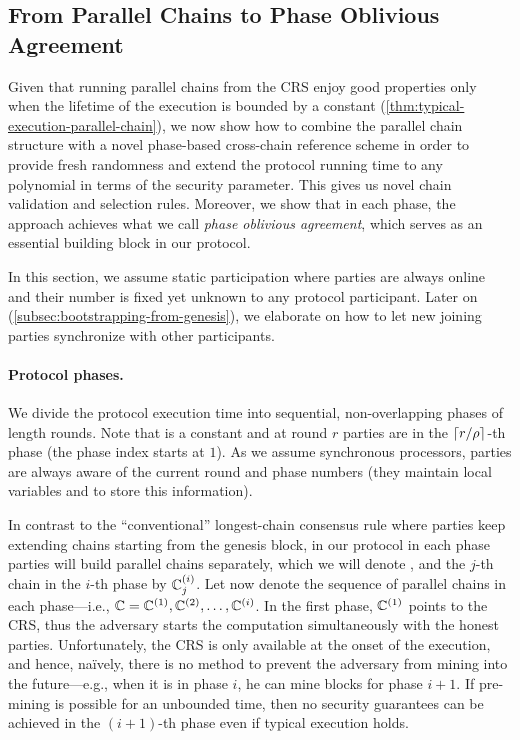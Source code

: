 \subsection{From Parallel Chains to Phase Oblivious Agreement}
\label{subsec:phase-oblivious-agreement}

Given that running parallel chains from the CRS enjoy good properties only when the lifetime of the execution is bounded by a constant (\cref{thm:typical-execution-parallel-chain}),  we now show how to combine the parallel chain structure with a novel phase-based cross-chain reference scheme in order to provide fresh randomness and extend the protocol running time to any polynomial in terms of the security parameter.
%
This gives us novel chain validation and selection rules.
%
Moreover, we show that in each phase, the approach achieves what we call \emph{phase oblivious agreement}, which serves as an essential building block in our \chainKingConsensus protocol.

In this section, we assume static participation where parties are always online and their number is fixed yet unknown to any protocol participant.
%
Later on (\cref{subsec:bootstrapping-from-genesis}), we elaborate on how to let new joining parties synchronize with other participants.

\paragraph{Protocol phases.}
%
We divide the protocol execution time into sequential, non-overlapping phases of length \phaseLength rounds.
%
Note that \phaseLength is a constant and at round $r$ parties are in the $\lceil r / \rho \rceil$-th phase (the phase index starts at $1$).
%
As we assume synchronous processors, parties are always aware of the current round and phase numbers (they maintain local variables \round and \phase to store this information).

In contrast to the ``conventional'' longest-chain consensus rule where parties keep extending chains starting from the genesis block, in our protocol in each phase parties will build parallel chains separately, which we will denote , and the $j$-th chain in the $i$-th phase by $\mathbb{C}^{(i)}_j$.
%
Let \parallelChains now denote the sequence of parallel chains in each phase---i.e., $\mathbb{C} = \mathbb{C}^{(1)}, \mathbb{C}^{(2)}, \ldots, \mathbb{C}^{(i)}$.
%
In the first phase, $\mathbb{C}^{(1)}$ points to the CRS, thus the adversary starts the computation simultaneously with the honest parties.
%
Unfortunately, the CRS is only available at the onset of the execution, and hence, na\"{i}vely, there is no method to prevent the adversary from mining into the future---e.g., when it is in phase $i$, he can mine blocks for phase $i + 1$.
%
If pre-mining is possible for an unbounded time, then no security guarantees can be achieved in the $(i + 1)$-th phase even if typical execution holds.

